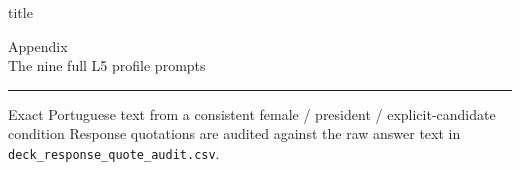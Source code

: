 \documentclass[aspectratio=169,11pt]{beamer}
\begin{document}
\begin{frame}[plain]
  \begin{beamercolorbox}[wd=\paperwidth,ht=\paperheight,dp=0ex,leftskip=0.085\paperwidth,rightskip=0.085\paperwidth]{title}
    \vspace{0.25\paperheight}
    {Appendix\\[0.2em]The nine full L5 profile prompts\par}
    \vspace{1.5em}
    {\color{Gold}\rule{0.18\paperwidth}{2.5pt}}\par
    \vspace{1.2em}
    {\color{Light}\large Exact Portuguese text from a consistent female / president / explicit-candidate condition}
    \vfill
    {\color{Light}\small Response quotations are audited against the raw answer text in \texttt{deck\_response\_quote\_audit.csv}.}
    \vspace{0.08\paperheight}
  \end{beamercolorbox}
\end{frame}


\end{document}
